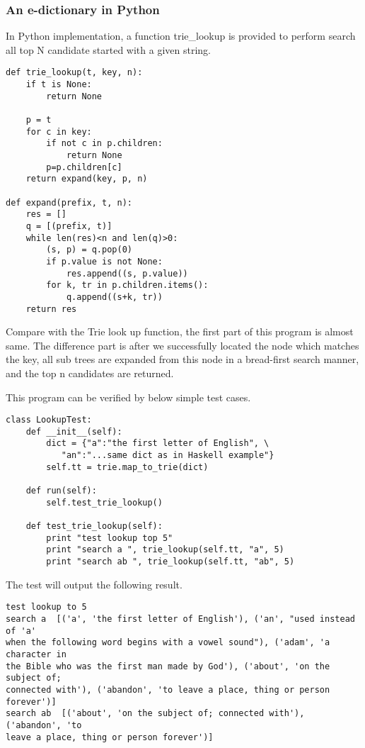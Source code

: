 \documentclass{article}
\begin{document}
\subsubsection*{An e-dictionary in Python}
In Python implementation, a function trie\_lookup is provided to perform
search all top N candidate started with a given string.

\lstset{language=Python}
\begin{lstlisting}
def trie_lookup(t, key, n):
    if t is None:
        return None

    p = t
    for c in key:
        if not c in p.children:
            return None
        p=p.children[c]
    return expand(key, p, n)

def expand(prefix, t, n):
    res = []
    q = [(prefix, t)]
    while len(res)<n and len(q)>0:
        (s, p) = q.pop(0)
        if p.value is not None:
            res.append((s, p.value))
        for k, tr in p.children.items():
            q.append((s+k, tr))
    return res
\end{lstlisting}

Compare with the Trie look up function, the first part of this program is almost
same. The difference part is after we successfully located the node
which matches the key, all sub trees are expanded from this node in a
bread-first search manner, and the top n candidates are returned.

This program can be verified by below simple test cases.

\begin{lstlisting}
class LookupTest:
    def __init__(self):
        dict = {"a":"the first letter of English", \
           "an":"...same dict as in Haskell example"}
        self.tt = trie.map_to_trie(dict)

    def run(self):
        self.test_trie_lookup()

    def test_trie_lookup(self):
        print "test lookup top 5"
        print "search a ", trie_lookup(self.tt, "a", 5)
        print "search ab ", trie_lookup(self.tt, "ab", 5)
\end{lstlisting}

The test will output the following result.

\begin{verbatim}
test lookup to 5
search a  [('a', 'the first letter of English'), ('an', "used instead of 'a'
when the following word begins with a vowel sound"), ('adam', 'a character in
the Bible who was the first man made by God'), ('about', 'on the subject of;
connected with'), ('abandon', 'to leave a place, thing or person forever')]
search ab  [('about', 'on the subject of; connected with'), ('abandon', 'to
leave a place, thing or person forever')]
\end{verbatim}
\end{document}
